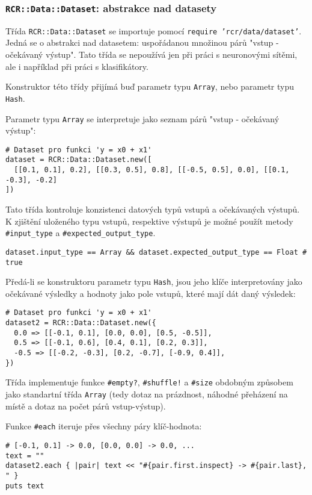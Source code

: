 \documentclass[a4paper]{article}
\begin{document}
\subsubsection{\texttt{RCR::Data::Dataset}: abstrakce nad datasety}
Třída \texttt{RCR::Data::Dataset} se importuje pomocí \texttt{require
'rcr/data/dataset'}. Jedná se o abstrakci nad datasetem: uspořádanou
množinou párů "vstup - očekávaný výstup". Tato třída se nepoužívá jen
při práci s neuronovými sítěmi, ale i například při práci s klasifikátory.

Konstruktor této třídy přijímá buď parametr typu \texttt{Array}, nebo parametr
typu \texttt{Hash}.

Parametr typu \texttt{Array} se interpretuje jako seznam
párů "vstup - očekávaný výstup":
\begin{lstlisting}
# Dataset pro funkci 'y = x0 + x1'
dataset = RCR::Data::Dataset.new([
  [[0.1, 0.1], 0.2], [[0.3, 0.5], 0.8], [[-0.5, 0.5], 0.0], [[0.1, -0.3], -0.2]
])
\end{lstlisting}

Tato třída kontroluje konzistenci datových typů vstupů a očekávaných výstupů.
K zjištění uloženého typu vstupů, respektive výstupů je možné použít metody
\texttt{\#input\_type} a \texttt{\#expected\_output\_type}.
\begin{lstlisting}
dataset.input_type == Array && dataset.expected_output_type == Float # true
\end{lstlisting}

Předá-li se konstruktoru parametr typu \texttt{Hash}, jsou jeho
klíče interpretovány jako očekávané výsledky a hodnoty jako
pole vstupů, které mají dát daný výsledek:
\begin{lstlisting}
# Dataset pro funkci 'y = x0 + x1'
dataset2 = RCR::Data::Dataset.new({
  0.0 => [[-0.1, 0.1], [0.0, 0.0], [0.5, -0.5]],
  0.5 => [[-0.1, 0.6], [0.4, 0.1], [0.2, 0.3]],
  -0.5 => [[-0.2, -0.3], [0.2, -0.7], [-0.9, 0.4]],
})
\end{lstlisting}

Třída implementuje funkce \texttt{\#empty?}, \texttt{\#shuffle!} a
\texttt{\#size} obdobným způsobem jako standartní třída \texttt{Array}
(tedy dotaz na prázdnost, náhodné přeházení na místě a dotaz na počet párů
vstup-výstup).

Funkce \texttt{\#each} iteruje přes všechny páry klíč-hodnota:
\begin{lstlisting}
# [-0.1, 0.1] -> 0.0, [0.0, 0.0] -> 0.0, ...
text = ""
dataset2.each { |pair| text << "#{pair.first.inspect} -> #{pair.last}, " }
puts text
\end{lstlisting}
\end{document}
